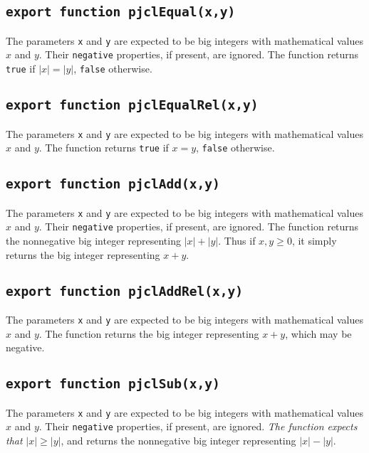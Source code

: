 \documentclass[12pt]{article}
\begin{document}
\subsection{\tt export function pjclEqual(x,y)}

The parameters {\tt x} and {\tt y} are expected to be big integers
with mathematical values $x$ and $y$.  Their {\tt negative}
properties, if present, are ignored.  The function returns {\tt true}
if $|x| = |y|$, {\tt false} otherwise.

\subsection{\tt export function pjclEqualRel(x,y)}

The parameters {\tt x} and {\tt y} are expected to be big integers
with mathematical values $x$ and $y$.  The function returns {\tt true}
if $x = y$, {\tt false} otherwise.

\subsection{\tt export function pjclAdd(x,y)}

The parameters {\tt x} and {\tt y} are expected to be big integers
with mathematical values $x$ and $y$.  Their {\tt negative}
properties, if present, are ignored.  The function returns the
nonnegative big integer representing $|x| + |y|$.  Thus if $x, y \geq 0$,
it simply returns the big integer representing $x+y$.

\subsection{\tt export function pjclAddRel(x,y)}

The parameters {\tt x} and {\tt y} are expected to be big integers
with mathematical values $x$ and $y$.  The function returns
the big integer representing $x+y$, which may be negative.

\subsection{\tt export function pjclSub(x,y)}

The parameters {\tt x} and {\tt y} are expected to be big integers
with mathematical values $x$ and $y$.  Their {\tt negative}
properties, if present, are ignored.  {\em The function expects
  that\/} $|x| \geq |y|$, and returns the nonnegative big integer
representing $|x| - |y|$.
\end{document}
